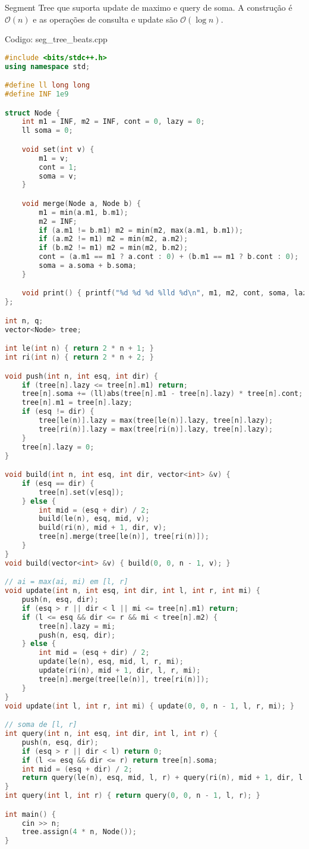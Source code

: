 \documentclass[10pt, a4paper, oneside]{book}
\begin{document}
Segment Tree que suporta update de maximo e query de soma. A construção é $\mathcal{O}(n)$ e as operações de consulta e update são $\mathcal{O}(\log n)$.

\hfill

Codigo: seg\_tree\_beats.cpp

\begin{lstlisting}[language=C++]
#include <bits/stdc++.h>
using namespace std;

#define ll long long
#define INF 1e9

struct Node {
    int m1 = INF, m2 = INF, cont = 0, lazy = 0;
    ll soma = 0;

    void set(int v) {
        m1 = v;
        cont = 1;
        soma = v;
    }

    void merge(Node a, Node b) {
        m1 = min(a.m1, b.m1);
        m2 = INF;
        if (a.m1 != b.m1) m2 = min(m2, max(a.m1, b.m1));
        if (a.m2 != m1) m2 = min(m2, a.m2);
        if (b.m2 != m1) m2 = min(m2, b.m2);
        cont = (a.m1 == m1 ? a.cont : 0) + (b.m1 == m1 ? b.cont : 0);
        soma = a.soma + b.soma;
    }

    void print() { printf("%d %d %d %lld %d\n", m1, m2, cont, soma, lazy); }
};

int n, q;
vector<Node> tree;

int le(int n) { return 2 * n + 1; }
int ri(int n) { return 2 * n + 2; }

void push(int n, int esq, int dir) {
    if (tree[n].lazy <= tree[n].m1) return;
    tree[n].soma += (ll)abs(tree[n].m1 - tree[n].lazy) * tree[n].cont;
    tree[n].m1 = tree[n].lazy;
    if (esq != dir) {
        tree[le(n)].lazy = max(tree[le(n)].lazy, tree[n].lazy);
        tree[ri(n)].lazy = max(tree[ri(n)].lazy, tree[n].lazy);
    }
    tree[n].lazy = 0;
}

void build(int n, int esq, int dir, vector<int> &v) {
    if (esq == dir) {
        tree[n].set(v[esq]);
    } else {
        int mid = (esq + dir) / 2;
        build(le(n), esq, mid, v);
        build(ri(n), mid + 1, dir, v);
        tree[n].merge(tree[le(n)], tree[ri(n)]);
    }
}
void build(vector<int> &v) { build(0, 0, n - 1, v); }

// ai = max(ai, mi) em [l, r]
void update(int n, int esq, int dir, int l, int r, int mi) {
    push(n, esq, dir);
    if (esq > r || dir < l || mi <= tree[n].m1) return;
    if (l <= esq && dir <= r && mi < tree[n].m2) {
        tree[n].lazy = mi;
        push(n, esq, dir);
    } else {
        int mid = (esq + dir) / 2;
        update(le(n), esq, mid, l, r, mi);
        update(ri(n), mid + 1, dir, l, r, mi);
        tree[n].merge(tree[le(n)], tree[ri(n)]);
    }
}
void update(int l, int r, int mi) { update(0, 0, n - 1, l, r, mi); }

// soma de [l, r]
int query(int n, int esq, int dir, int l, int r) {
    push(n, esq, dir);
    if (esq > r || dir < l) return 0;
    if (l <= esq && dir <= r) return tree[n].soma;
    int mid = (esq + dir) / 2;
    return query(le(n), esq, mid, l, r) + query(ri(n), mid + 1, dir, l, r);
}
int query(int l, int r) { return query(0, 0, n - 1, l, r); }

int main() {
    cin >> n;
    tree.assign(4 * n, Node());
}
\end{lstlisting}
\hfill
\end{document}
